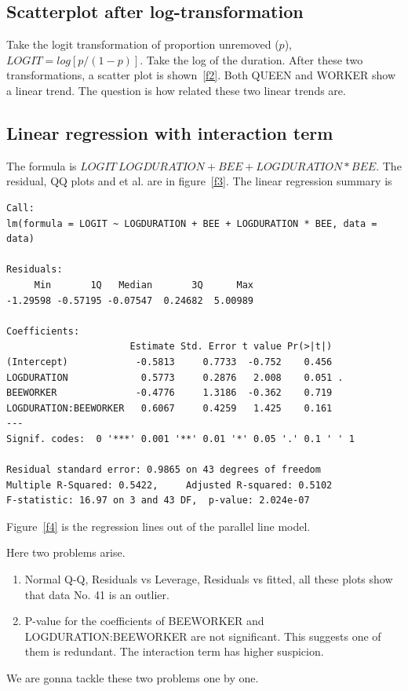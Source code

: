 \documentclass[a4paper,10pt]{article}
\begin{document}
\subsection{Scatterplot after log-transformation}
Take the logit transformation of proportion unremoved ($p$), $LOGIT=log[p/(1-p)]$. Take the log of the duration. After these two transformations, a scatter plot is shown~\ref{f2}. Both QUEEN and WORKER show a linear trend. The question is how related these two linear trends are. 

\subsection{Linear regression with interaction term}
The formula is $LOGIT~LOGDURATION+BEE+LOGDURATION*BEE$. The residual, QQ plots and et al. are in figure~\ref{f3}. The linear regression summary is
\begin{verbatim}
Call:
lm(formula = LOGIT ~ LOGDURATION + BEE + LOGDURATION * BEE, data = data)

Residuals:
     Min       1Q   Median       3Q      Max
-1.29598 -0.57195 -0.07547  0.24682  5.00989

Coefficients:
                      Estimate Std. Error t value Pr(>|t|)
(Intercept)            -0.5813     0.7733  -0.752    0.456
LOGDURATION             0.5773     0.2876   2.008    0.051 .
BEEWORKER              -0.4776     1.3186  -0.362    0.719
LOGDURATION:BEEWORKER   0.6067     0.4259   1.425    0.161
---
Signif. codes:  0 '***' 0.001 '**' 0.01 '*' 0.05 '.' 0.1 ' ' 1

Residual standard error: 0.9865 on 43 degrees of freedom
Multiple R-Squared: 0.5422,     Adjusted R-squared: 0.5102
F-statistic: 16.97 on 3 and 43 DF,  p-value: 2.024e-07
\end{verbatim}

Figure~\ref{f4} is the regression lines out of the parallel line model.

Here two problems arise.
\begin{enumerate}
 \item Normal Q-Q, Residuals vs Leverage, Residuals vs fitted, all these plots show that data No. 41 is an outlier.
 \item P-value for the coefficients of BEEWORKER and LOGDURATION:BEEWORKER are not significant. This suggests one of them is redundant. The interaction term has higher suspicion.
\end{enumerate}
We are gonna tackle these two problems one by one.
\end{document}
